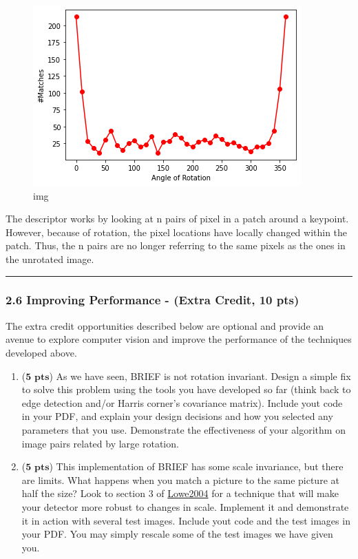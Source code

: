 \documentclass[11pt]{article}
\begin{document}
    \begin{figure}
\centering
\includegraphics{results/q2_5.png}
\caption{img}
\end{figure}

The descriptor works by looking at n pairs of pixel in a patch around a
keypoint. However, because of rotation, the pixel locations have locally
changed within the patch. Thus, the n pairs are no longer referring to
the same pixels as the ones in the unrotated image.

\begin{center}\rule{0.5\linewidth}{0.5pt}\end{center}

    \hypertarget{improving-performance---extra-credit-10-pts}{%
\subsubsection{2.6 Improving Performance - (Extra Credit, 10
pts)}\label{improving-performance---extra-credit-10-pts}}

The extra credit opportunities described below are optional and provide
an avenue to explore computer vision and improve the performance of the
techniques developed above.

\begin{enumerate}
\def\labelenumi{\arabic{enumi}.}
\item
  (\(\textbf{5 pts}\)) As we have seen, BRIEF is not rotation invariant.
  Design a simple fix to solve this problem using the tools you have
  developed so far (think back to edge detection and/or Harris corner's
  covariance matrix). Include yout code in your PDF, and explain your
  design decisions and how you selected any parameters that you use.
  Demonstrate the effectiveness of your algorithm on image pairs related
  by large rotation.
\item
  (\(\textbf{5 pts}\)) This implementation of BRIEF has some scale
  invariance, but there are limits. What happens when you match a
  picture to the same picture at half the size? Look to section 3 of
  \href{https://www.cs.ubc.ca/~lowe/papers/ijcv04.pdf}{Lowe2004} for a
  technique that will make your detector more robust to changes in
  scale. Implement it and demonstrate it in action with several test
  images. Include yout code and the test images in your PDF. You may
  simply rescale some of the test images we have given you.
\end{enumerate}
\end{document}
